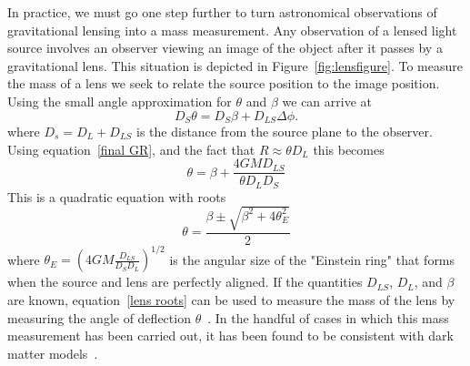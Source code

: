 In practice, we must go one step further to turn astronomical observations of gravitational lensing into a mass measurement.  Any observation of a lensed light source involves an observer viewing an image of the object after it passes by a gravitational lens.  This situation is depicted in Figure~\ref{fig:lensfigure}. To measure the mass of a lens we seek to relate the source position to the image position. Using the small angle approximation for $\theta$ and $\beta$ we can arrive at
\begin{equation} \label{lens eq 1}
D_S \theta = D_S\beta + D_{LS} \Delta \phi.
\end{equation}
where $D_s=D_L+D_{LS}$ is the distance from the source plane to the observer.  Using equation~\ref{final GR}, and the fact that $R \approx \theta D_L$ this becomes
\begin{equation} \label{lens eq 2}
\theta = \beta + \frac{4GM D_{LS}}{\theta D_L D_S}
\end{equation}
This is a quadratic equation with roots
\begin{equation} \label{lens roots}
\theta = \frac{ \beta \pm \sqrt{ \beta^2 + 4 \theta^2_E}}{2}
\end{equation}
where $\theta_E = \left(4GM \frac{D_{LS}}{D_S D_L} \right)^{1/2}$ is the angular size of the "Einstein ring" that forms when the source and lens are perfectly aligned.  If the quantities $D_{LS}$, $D_L$, and $\beta$ are known, equation~\ref{lens roots} can be used to measure the mass of the lens by measuring the angle of deflection $\theta$~\cite{Bin-Nun}. In the handful of cases in which this mass measurement has been carried out, it has been found to be consistent with dark matter models~\cite{Wu}. %


